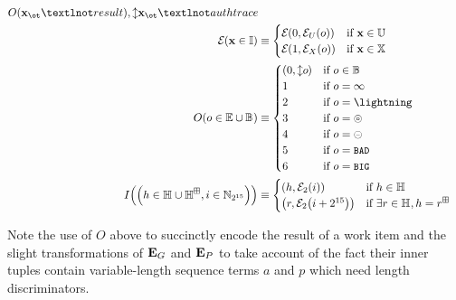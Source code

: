 \begin{align}
{    \encoderesult{\otX_\ot¬result},
    \var{\otX_\ot¬authtrace}
  }
  \\
  \encode{\aiX \in \accinput} &\equiv \begin{cases}
      \encode{0, \encode[U]{o}} &\when \aiX \in \operandtuple \\
      \encode{1, \encode[X]{o}} &\when \aiX \in \defxfer \\
  \end{cases}
  \\
  \encoderesult{o \in \workerror \cup \blob} &\equiv \begin{cases}
    \tup{0, \var{o}} &\when o \in \blob \\
    1 &\when o = \infty \\
    2 &\when o = \panic \\
    3 &\when o = \badexports \\
    4 &\when o = \oversize \\
    5 &\when o = \token{BAD} \\
    6 &\when o = \token{BIG}
    \\
  \end{cases}
  \\
  \encodeimportref{\tup{
    h \in \hash \cup \hash^\boxplus,
    i \in \Nbits{15}
  }} &\equiv \begin{cases}
    \tup{h, \encode[2]{i}} &\when h \in \hash\\
    \tup{r, \encode[2]{i + 2^{15}}} &\when \exists r \in \hash, h = r^\boxplus\\
  \end{cases}
\end{align}

Note the use of $O$ above to succinctly encode the result of a work item and the slight transformations of $\mathbf{E}_G$ and $\mathbf{E}_P$ to take account of the fact their inner tuples contain variable-length sequence terms $a$ and $p$ which need length discriminators.
